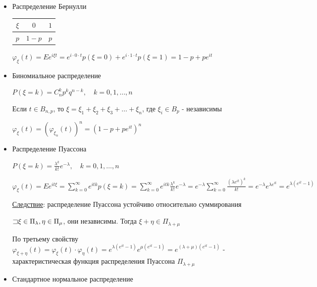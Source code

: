\documentclass[12pt]{article}
\begin{document}
\begin{itemize}
    \item Распределение Бернулли

    \smallvspace

    \begin{tabular}{c|c|c}
        $\xi$ & $0$     & $1$    \\
        \hline
        $p$   & $1 - p$ & $p$
    \end{tabular}

    \smallvspace

    $\varphi_\xi(t) = Ee^{i\xi t} = e^{i \cdot 0 \cdot t} p(\xi = 0) + e^{i \cdot 1 \cdot t} p(\xi = 1) = 1 - p + p e^{it}$

    \item Биномиальное распределение

    $P(\xi = k) = C_n^k p^k q^{n - k}, \quad k = 0, 1, \dots, n$

    Если $t \in B_{n,p}$, то $\xi = \xi_1 + \xi_2 + \xi_3 + \dots + \xi_n$, где $\xi_i \in B_p$ - независимы

    $\varphi_\xi(t) = (\varphi_{\xi_n}(t))^n = (1 - p + p e^{it})^n$

    \item Распределение Пуассона

    $P(\xi = k) = \frac{\lambda^k}{k!} e^{-\lambda}, \quad k = 0, 1, \dots, n$

    $\varphi_\xi(t) = Ee^{it\xi} = \sum_{k = 0}^\infty e^{itk} p(\xi = k) = \sum_{k = 0}^\infty e^{itk} \frac{\lambda^k}{k!} e^{-\lambda} = 
    e^{-\lambda} \sum_{k = 0}^\infty \frac{(\lambda e^{it})^k}{k!} = e^{-\lambda} e^{\lambda e^{it}} = e^{\lambda (e^{it} - 1)}$

    \underline{Следствие}: распределение Пуассона устойчиво относительно суммирования

    \begin{MyTheorem}
        $\mathord{\sqsupset} \xi \in \Pi_\lambda, \eta \in \Pi_\mu$, они независимы. Тогда $\xi + \eta \in \Pi_{\lambda + \mu}$
    \end{MyTheorem}

    \begin{MyProof}
        По третьему свойству $\varphi_{\xi + \eta}(t) = \varphi_\xi(t) \cdot \varphi_\eta(t) = e^{\lambda(e^{it} - 1)} e^{\mu(e^{it} - 1)} = e^{(\lambda + \mu)(e^{it} - 1)}$ - характеристическая функция распределения Пуассона $\Pi_{\lambda + \mu}$
    \end{MyProof}

    \item Стандартное нормальное распределение


\end{itemize}
\end{document}
